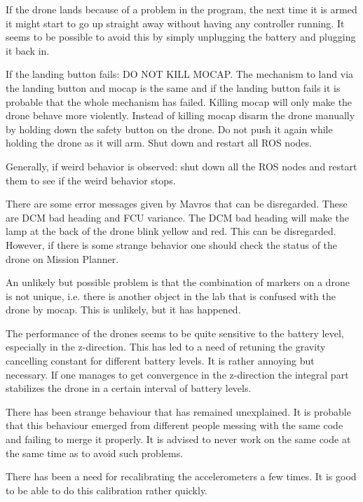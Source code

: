 \documentclass[titlepage,11pt,a4paper]{article}
\begin{document}
If the drone lands because of a problem in the program, the next time
it is armed it might start to go up straight away without having any
controller running. It seems to be possible to avoid this by simply
unplugging the battery and plugging it back in.

If the landing button fails: DO NOT KILL MOCAP. The mechanism to land
via the landing button and mocap is the same and if the landing button
fails it is probable that the whole mechanism has failed. Killing
mocap will only make the drone behave more violently. Instead of
killing mocap disarm the drone manually by holding down the safety
button on the drone. Do not push it again while holding the drone as
it will arm. Shut down and restart all ROS nodes.

Generally, if weird behavior is observed: shut down all the ROS nodes
and restart them to see if the weird behavior stops.

There are some error messages given by Mavros that can be
disregarded. These are DCM bad heading and FCU variance. The DCM bad
heading will make the lamp at the back of the drone blink yellow and
red. This can be disregarded. However, if there is some strange
behavior one should check the status of the drone on Mission Planner.

An unlikely but possible problem is that the combination of markers on
a drone is not unique, i.e. there is another object in the lab that is
confused with the drone by mocap. This is unlikely, but it has
happened.

The performance of the drones seems to be quite sensitive to the
battery level, especially in the z-direction. This has led to a need
of retuning the gravity cancelling constant for different battery
levels. It is rather annoying but necessary. If one manages to get
convergence in the z-direction the integral part stabilizes the drone
in a certain interval of battery levels.

There has been strange behaviour that has remained unexplained. It is
probable that this behaviour emerged from different people messing
with the same code and failing to merge it properly. It is advised to
never work on the same code at the same time as to avoid such
problems.

There has been a need for recalibrating the accelerometers a few
times. It is good to be able to do this calibration rather quickly.
\end{document}

